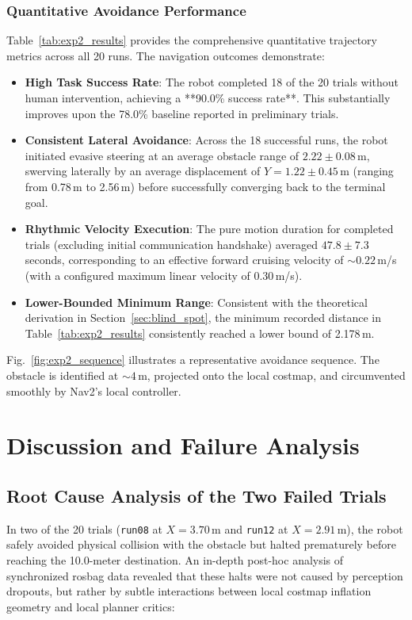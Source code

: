 \documentclass{ieeeaccess}
\begin{document}
\subsubsection{Quantitative Avoidance Performance}
Table~\ref{tab:exp2_results} provides the comprehensive quantitative trajectory metrics across all 20 runs. The navigation outcomes demonstrate:
\begin{itemize}
  \item \textbf{High Task Success Rate}: The robot completed 18 of the 20 trials without human intervention, achieving a **90.0\% success rate**. This substantially improves upon the 78.0\% baseline reported in preliminary trials.
  \item \textbf{Consistent Lateral Avoidance}: Across the 18 successful runs, the robot initiated evasive steering at an average obstacle range of $2.22 \pm 0.08$\,m, swerving laterally by an average displacement of $Y = 1.22 \pm 0.45$\,m (ranging from 0.78\,m to 2.56\,m) before successfully converging back to the terminal goal.
  \item \textbf{Rhythmic Velocity Execution}: The pure motion duration for completed trials (excluding initial communication handshake) averaged $47.8 \pm 7.3$\,seconds, corresponding to an effective forward cruising velocity of $\sim0.22$\,m/s (with a configured maximum linear velocity of 0.30\,m/s).
  \item \textbf{Lower-Bounded Minimum Range}: Consistent with the theoretical derivation in Section~\ref{sec:blind_spot}, the minimum recorded distance in Table~\ref{tab:exp2_results} consistently reached a lower bound of 2.178\,m.
\end{itemize}

Fig.~\ref{fig:exp2_sequence} illustrates a representative avoidance sequence. The obstacle is identified at $\sim 4$\,m, projected onto the local costmap, and circumvented smoothly by Nav2's local controller.

\section{Discussion and Failure Analysis}
\label{sec:discussion}

\subsection{Root Cause Analysis of the Two Failed Trials}
\label{subsec:failure_analysis}
In two of the 20 trials (\texttt{run08} at $X=3.70$\,m and \texttt{run12} at $X=2.91$\,m), the robot safely avoided physical collision with the obstacle but halted prematurely before reaching the 10.0-meter destination. An in-depth post-hoc analysis of synchronized rosbag data revealed that these halts were not caused by perception dropouts, but rather by subtle interactions between local costmap inflation geometry and local planner critics:
\end{document}
